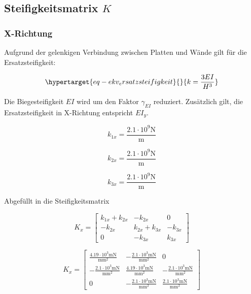 \documentclass[
  letterpaper,
  DIV=11]{scrreprt}
\begin{document}
\hypertarget{steifigkeitsmatrix-k-2}{%
\subsection{\texorpdfstring{Steifigkeitsmatrix
\(K\)}{Steifigkeitsmatrix K}}\label{steifigkeitsmatrix-k-2}}

\hypertarget{x-richtung-1}{%
\subsubsection{X-Richtung}\label{x-richtung-1}}

Aufgrund der gelenkigen Verbindung zwischen Platten und Wände gilt für
die Ersatzsteifigkeit:

\begin{equation}\protect\hypertarget{eq-ekv_ersatzsteifigkeit}{}{
k = \frac{3EI}{H^3}
}\label{eq-ekv_ersatzsteifigkeit}\end{equation}

Die Biegesteifigkeit \(EI\) wird um den Faktor \(\gamma_{EI}\)
reduziert. Zusätzlich gilt, die Ersatzsteifigkeit in X-Richtung
entspricht \(EI_y\).

\begin{equation}k_{1 x} = \frac{2.1 \cdot 10^{9} \text{N}}{\text{m}}\end{equation}

\begin{equation}k_{2 x} = \frac{2.1 \cdot 10^{9} \text{N}}{\text{m}}\end{equation}

\begin{equation}k_{3 x} = \frac{2.1 \cdot 10^{9} \text{N}}{\text{m}}\end{equation}

Abgefüllt in die Steifigkeitsmatrix

\begin{equation}K_{x} = \left[\begin{matrix}k_{1 x} + k_{2 x} & - k_{2 x} & 0\\- k_{2 x} & k_{2 x} + k_{3 x} & - k_{3 x}\\0 & - k_{3 x} & k_{3 x}\end{matrix}\right]\end{equation}

\begin{equation}K_{x} = \left[\begin{matrix}\frac{4.19 \cdot 10^{3} \text{m} \text{N}}{\text{mm}^{2}} & - \frac{2.1 \cdot 10^{3} \text{m} \text{N}}{\text{mm}^{2}} & 0\\- \frac{2.1 \cdot 10^{3} \text{m} \text{N}}{\text{mm}^{2}} & \frac{4.19 \cdot 10^{3} \text{m} \text{N}}{\text{mm}^{2}} & - \frac{2.1 \cdot 10^{3} \text{m} \text{N}}{\text{mm}^{2}}\\0 & - \frac{2.1 \cdot 10^{3} \text{m} \text{N}}{\text{mm}^{2}} & \frac{2.1 \cdot 10^{3} \text{m} \text{N}}{\text{mm}^{2}}\end{matrix}\right]\end{equation}
\end{document}
